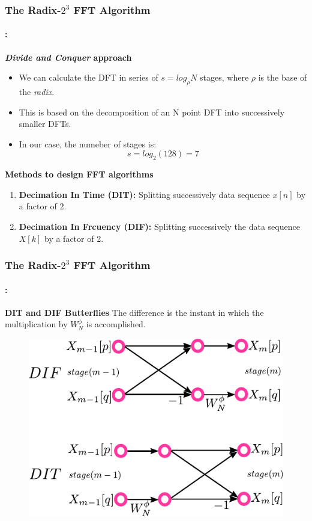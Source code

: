 \begin{frame}
  	\frametitle{\textbf{The Radix-$2^3$ FFT  Algorithm}}
	\framesubtitle{\secname : \subsecname}
	\begin{block}{\centering \textbf{\textit{Divide and Conquer} approach}}
		\begin{itemize} \justifying\footnotesize		
			\item We can calculate the DFT in series of $s=log_\rho N$ stages, where $\rho$ is the base of the \textit{radix}. 
			\item This is based on the decomposition of an N point DFT into successively smaller DFTs.
			\item  In our case, the numeber of stages is:
		 	\begin{equation}
		 			s = log_2 (128) = 7 
		 	\end{equation}
		\end{itemize}		
	\end{block}

	\begin{block}{\centering \textbf{Methods to design FFT algorithms}}
		\begin{enumerate} \justifying\footnotesize
			\item \textbf{Decimation In Time (DIT):} Splitting successively data sequence $x[n]$ by a factor of 2. 					
			\item \textbf{Decimation In Frcuency (DIF):} Splitting successively the data sequence $X[k]$ by a factor of 2. 
		\end{enumerate}											
  	\end{block}
\end{frame}

\begin{frame}
  	\frametitle{\textbf{The Radix-$2^3$ FFT  Algorithm}}
	\framesubtitle{\secname : \subsecname}
	\begin{block}{\centering \textbf{DIT and DIF Butterflies}}
		The difference is the instant in which the multiplication by $W_N^\phi$ is accomplished. 
	\end{block}    	
    	\vspace{-0.2cm}
    	\begin{figure}[h!] \centering
    		\includegraphics[width=0.45\paperwidth]{./image/DifDit.pdf}
    	\end{figure}
\end{frame}

